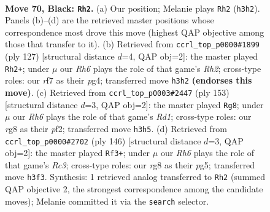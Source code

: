 \documentclass[11pt]{article}
\begin{document}
\clearpage

\begin{figure}[p]\centering
\begin{subfigure}{0.46\textwidth}\centering
\resizebox{\linewidth}{!}{%
\newchessgame
\chessboard[
  setfen={6R1/5R2/3k4/8/1P2b3/7r/8/4K3 b - - 14 70},
  showmover=false,
  pgfstyle=straightmove, color=movearrow, markmove={h3-h2}
]}
\caption{}
\end{subfigure}\hfill
\begin{subfigure}{0.46\textwidth}\centering
\resizebox{\linewidth}{!}{%
\newchessgame
\chessboard[
  setfen={R7/7r/5b2/8/4k1P1/8/5K2/8 b - - 0 64},
  showmover=false,
  pgfstyle=straightmove, color=movearrow, markmove={h7-h2}
]}
\caption{}
\end{subfigure}
\\[4pt]
\begin{subfigure}{0.46\textwidth}\centering
\resizebox{\linewidth}{!}{%
\newchessgame
\chessboard[
  setfen={3r4/8/8/5k2/R7/5b2/5P1K/8 b - - 21 77},
  showmover=false,
  pgfstyle=straightmove, color=movearrow, markmove={d8-g8}
]}
\caption{}
\end{subfigure}\hfill
\begin{subfigure}{0.46\textwidth}\centering
\resizebox{\linewidth}{!}{%
\newchessgame
\chessboard[
  setfen={8/4r3/1K6/6pB/8/2R5/5k2/8 w - - 2 74},
  showmover=false,
  pgfstyle=straightmove, color=movearrow, markmove={c3-f3}
]}
\caption{}
\end{subfigure}
\caption{\textbf{Move 70, Black: \texttt{Rh2}.} (a) Our position; Melanie plays \texttt{Rh2} (\texttt{h3h2}). Panels (b)--(d) are the retrieved master positions whose correspondence most drove this move (highest QAP objective among those that transfer to it). (b) Retrieved from \texttt{ccrl\_top\_p0000\#1899} (ply 127) [structural distance $d$=4, QAP obj=2]: the master played \texttt{Rh2+}; under $\mu$ our \emph{Rh6} plays the role of that game's \emph{Rh2}; cross-type roles: our \emph{r}f7 as their \emph{p}g4; transferred move \texttt{h3h2} \textbf{(endorses this move)}. (c) Retrieved from \texttt{ccrl\_top\_p0003\#2447} (ply 153) [structural distance $d$=3, QAP obj=2]: the master played \texttt{Rg8}; under $\mu$ our \emph{Rh6} plays the role of that game's \emph{Rd1}; cross-type roles: our \emph{r}g8 as their \emph{p}f2; transferred move \texttt{h3h5}. (d) Retrieved from \texttt{ccrl\_top\_p0000\#2702} (ply 146) [structural distance $d$=3, QAP obj=2]: the master played \texttt{Rf3+}; under $\mu$ our \emph{Rh6} plays the role of that game's \emph{Rc3}; cross-type roles: our \emph{r}g8 as their \emph{p}g5; transferred move \texttt{h3f3}. Synthesis: 1 retrieved analog transferred to \texttt{Rh2} (summed QAP objective 2, the strongest correspondence among the candidate moves); Melanie committed it via the \texttt{search} selector.}
\label{fig:thought-m139}
\end{figure}
\end{document}

